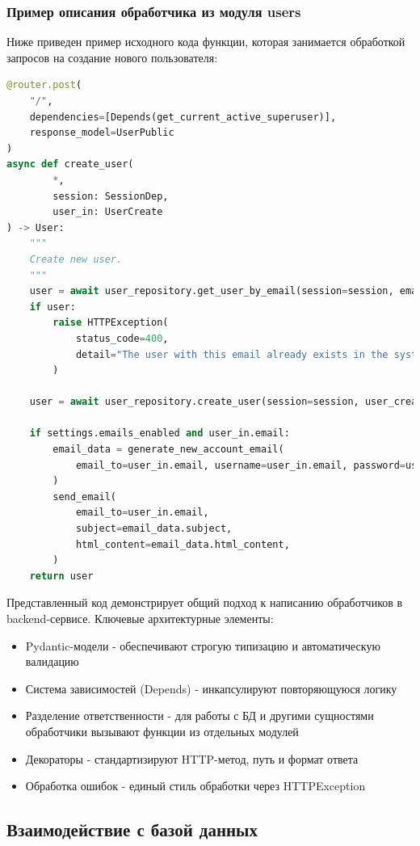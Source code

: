 \subsubsection{Пример описания обработчика из модуля users}
Ниже приведен пример исходного кода функции, которая занимается обработкой запросов на создание нового пользователя:
\begin{lstlisting}[language=Python, numbers=none, frame=none]
@router.post(
    "/",
    dependencies=[Depends(get_current_active_superuser)],
    response_model=UserPublic
)
async def create_user(
        *,
        session: SessionDep,
        user_in: UserCreate
) -> User:
    """
    Create new user.
    """
    user = await user_repository.get_user_by_email(session=session, email=user_in.email)
    if user:
        raise HTTPException(
            status_code=400,
            detail="The user with this email already exists in the system.",
        )

    user = await user_repository.create_user(session=session, user_create=user_in)

    if settings.emails_enabled and user_in.email:
        email_data = generate_new_account_email(
            email_to=user_in.email, username=user_in.email, password=user_in.password
        )
        send_email(
            email_to=user_in.email,
            subject=email_data.subject,
            html_content=email_data.html_content,
        )
    return user
\end{lstlisting}
Представленный код демонстрирует общий подход к написанию обработчиков в backend-сервисе.\newline
Ключевые архитектурные элементы:
\begin{itemize}
    \item Pydantic-модели - обеспечивают строгую типизацию и автоматическую валидацию
    \item Система зависимостей (Depends) - инкапсулируют повторяющуюся логику
    \item Разделение ответственности - для работы с БД и другими сущностями обработчики вызывают функции из отдельных модулей
    \item Декораторы - стандартизируют HTTP-метод, путь и формат ответа
    \item Обработка ошибок - единый стиль обработки через HTTPException
\end{itemize}

\subsection{Взаимодействие с базой данных}

